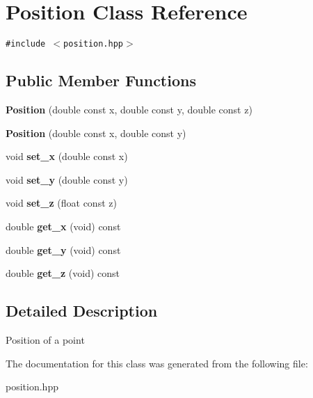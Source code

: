 \section{Position Class Reference}
\label{classPosition}
{\tt \#include $<$position.hpp$>$}

\subsection*{Public Member Functions}
\begin{CompactItemize}
\item 
{\bf Position} (double const x, double const y, double const z)\label{classPosition_a1}

\item 
{\bf Position} (double const x, double const y)\label{classPosition_a2}

\item 
void {\bf set\_\-x} (double const x)\label{classPosition_a3}

\item 
void {\bf set\_\-y} (double const y)\label{classPosition_a4}

\item 
void {\bf set\_\-z} (float const z)\label{classPosition_a5}

\item 
double {\bf get\_\-x} (void) const \label{classPosition_a6}

\item 
double {\bf get\_\-y} (void) const \label{classPosition_a7}

\item 
double {\bf get\_\-z} (void) const \label{classPosition_a8}

\end{CompactItemize}


\subsection{Detailed Description}
Position of a point 



The documentation for this class was generated from the following file:\begin{CompactItemize}
\item 
position.hpp\end{CompactItemize}
